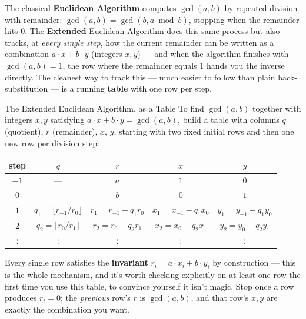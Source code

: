The classical \textbf{Euclidean Algorithm} computes $\gcd(a,b)$ by repeated division with remainder: $\gcd(a,b) = \gcd(b, a \bmod b)$, stopping when the remainder hits $0$. The \textbf{Extended} Euclidean Algorithm does this same process but also tracks, at \emph{every single step}, how the current remainder can be written as a combination $a\cdot x + b\cdot y$ (integers $x,y$) --- and when the algorithm finishes with $\gcd(a,b)=1$, the row where the remainder equals $1$ hands you the inverse directly. The cleanest way to track this --- much easier to follow than plain back-substitution --- is a running \textbf{table} with one row per step.

\begin{defbox}{The Extended Euclidean Algorithm, as a Table}
To find $\gcd(a,b)$ together with integers $x,y$ satisfying $a\cdot x + b\cdot y = \gcd(a,b)$, build a table with columns $q$ (quotient), $r$ (remainder), $x$, $y$, starting with two fixed initial rows and then one new row per division step:
\begin{center}
\begin{tabular}{c|c|c|c|c}
step & $q$ & $r$ & $x$ & $y$ \\
\hline
$-1$ & --- & $a$ & $1$ & $0$ \\
$0$ & --- & $b$ & $0$ & $1$ \\
$1$ & $q_1 = \lfloor r_{-1}/r_0 \rfloor$ & $r_1 = r_{-1} - q_1 r_0$ & $x_1 = x_{-1} - q_1 x_0$ & $y_1 = y_{-1} - q_1 y_0$ \\
$2$ & $q_2 = \lfloor r_0/r_1 \rfloor$ & $r_2 = r_0 - q_2 r_1$ & $x_2 = x_0 - q_2 x_1$ & $y_2 = y_0 - q_2 y_1$ \\
$\vdots$ & $\vdots$ & $\vdots$ & $\vdots$ & $\vdots$
\end{tabular}
\end{center}
Every single row satisfies the \textbf{invariant} $r_i = a \cdot x_i + b \cdot y_i$ by construction --- this is the whole mechanism, and it's worth checking explicitly on at least one row the first time you use this table, to convince yourself it isn't magic. Stop once a row produces $r_i = 0$; the \emph{previous} row's $r$ is $\gcd(a,b)$, and that row's $x,y$ are exactly the combination you want.
\end{defbox}

